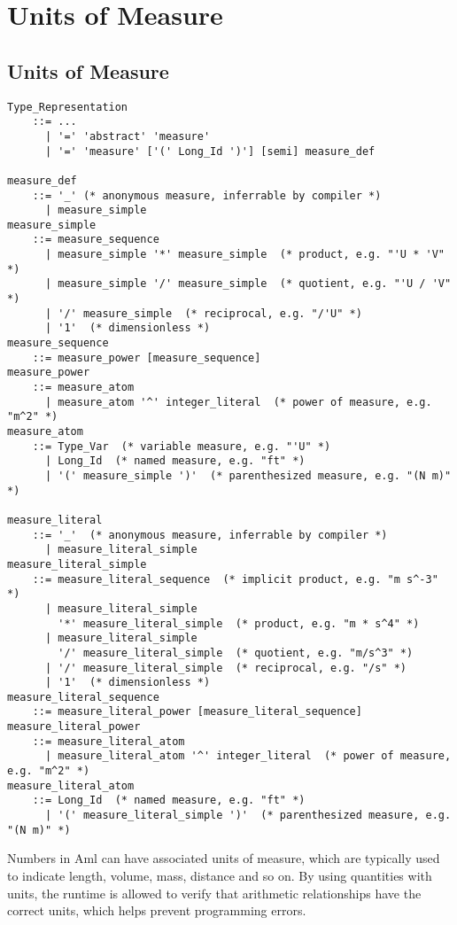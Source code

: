 
\chapter{Units of Measure}
\label{sec:units-of-measure}

\minitoc

\newpage

\section{Units of Measure}

\syntax\begin{lstlisting}
Type_Representation 
    ::= ...
      | '=' 'abstract' 'measure' 
      | '=' 'measure' ['(' Long_Id ')'] [semi] measure_def
      
measure_def 
    ::= '_' (* anonymous measure, inferrable by compiler *)
      | measure_simple
measure_simple
    ::= measure_sequence
      | measure_simple '*' measure_simple  (* product, e.g. "'U * 'V" *)
      | measure_simple '/' measure_simple  (* quotient, e.g. "'U / 'V" *)
      | '/' measure_simple  (* reciprocal, e.g. "/'U" *)
      | '1'  (* dimensionless *)
measure_sequence
    ::= measure_power [measure_sequence]
measure_power
    ::= measure_atom
      | measure_atom '^' integer_literal  (* power of measure, e.g. "m^2" *)
measure_atom
    ::= Type_Var  (* variable measure, e.g. "'U" *)
      | Long_Id  (* named measure, e.g. "ft" *)
      | '(' measure_simple ')'  (* parenthesized measure, e.g. "(N m)" *)
      
measure_literal
    ::= '_'  (* anonymous measure, inferrable by compiler *)
      | measure_literal_simple
measure_literal_simple
    ::= measure_literal_sequence  (* implicit product, e.g. "m s^-3" *)
      | measure_literal_simple 
        '*' measure_literal_simple  (* product, e.g. "m * s^4" *)
      | measure_literal_simple 
        '/' measure_literal_simple  (* quotient, e.g. "m/s^3" *)
      | '/' measure_literal_simple  (* reciprocal, e.g. "/s" *)
      | '1'  (* dimensionless *)
measure_literal_sequence
    ::= measure_literal_power [measure_literal_sequence]
measure_literal_power
    ::= measure_literal_atom
      | measure_literal_atom '^' integer_literal  (* power of measure, e.g. "m^2" *)
measure_literal_atom
    ::= Long_Id  (* named measure, e.g. "ft" *)
      | '(' measure_literal_simple ')'  (* parenthesized measure, e.g. "(N m)" *)
\end{lstlisting}

Numbers in Aml can have associated units of measure, which are typically used to indicate length, volume, mass, distance and so on. By using quantities with units, the runtime is allowed to verify that arithmetic relationships have the correct units, which helps prevent programming errors. 

